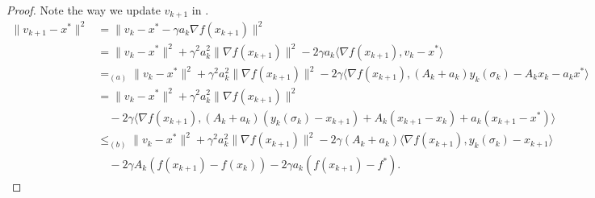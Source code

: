 \documentclass{article}
\begin{document}
\begin{proof}
    Note the way we update $v_{k+1}$ in .
    \begin{align*}
        \|v_{k+1} - x^*\|^2
         & = \|v_k - x^* - \gamma a_k \nabla f(x_{k+1})\|^2                                                                                                             \\
         & = \|v_k - x^*\|^2 + \gamma^2 a_k^2 \|\nabla f(x_{k+1})\|^2
        - 2\gamma a_k \langle \nabla f(x_{k+1}), v_k - x^* \rangle                                                                                                      \\
         & =_{(a)} \|v_k - x^*\|^2 + \gamma^2 a_k^2 \|\nabla f(x_{k+1})\|^2  - 2\gamma \langle \nabla f(x_{k+1}), (A_k + a_k) y_k(\sigma_k) - A_k x_k - a_k x^* \rangle \\
         & = \|v_k - x^*\|^2 + \gamma^2 a_k^2 \|\nabla f(x_{k+1})\|^2                                                                                                   \\
         & \quad - 2\gamma \langle \nabla f(x_{k+1}),
        (A_k + a_k)(y_k(\sigma_k) - x_{k+1}) + A_k(x_{k+1} - x_k)
        + a_k(x_{k+1} - x^*) \rangle                                                                                                                                    \\
         & \leq_{(b)} \|v_k - x^*\|^2 + \gamma^2 a_k^2 \|\nabla f(x_{k+1})\|^2 - 2\gamma (A_k + a_k) \langle \nabla f(x_{k+1}), y_k(\sigma_k) - x_{k+1} \rangle         \\
         & \quad - 2\gamma A_k \left(f(x_{k+1}) - f(x_k)\right)
        - 2\gamma a_k \left(f(x_{k+1}) - f^*\right).
    \end{align*}


\end{proof}
\end{document}
